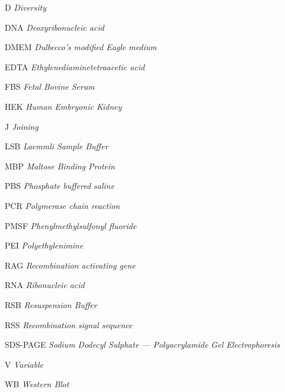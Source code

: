 \documentclass[
	12pt,				%
	openright,			%
	twoside,			%
	a4paper,			%
	]{abntex2}
\begin{document}

\begin{siglas}
	\item[D] \textit{Diversity}
	\item[DNA] \textit{Deoxyribonucleic acid}
	\item[DMEM] \textit{Dulbecco's modified Eagle medium}
	\item[EDTA] \textit{Ethylenediaminetetraacetic acid}
	\item[FBS] \textit{Fetal Bovine Serum}
	\item[HEK] \textit{Human Embryonic Kidney}
	\item[J] \textit{Joining}
	\item[LSB] \textit{Laemmli Sample Buffer}
	\item[MBP] \textit{Maltose Binding Protein}
	\item[PBS] \textit{Phosphate buffered saline}
	\item[PCR] \textit{Polymerase chain reaction}
	\item[PMSF] \textit{Phenylmethylsulfonyl fluoride}
	\item[PEI] \textit{Polyethylenimine}
	\item[RAG] \textit{Recombination activating gene}
	\item[RNA] \textit{Ribonucleic acid}
	\item[RSB] \textit{Resuspension Buffer}
	\item[RSS] \textit{Recombination signal sequence}
	\item[SDS-PAGE] \textit{Sodium Dodecyl Sulphate --- Polyacrylamide Gel Electrophoresis}
	\item[V] \textit{Variable}
	\item[WB] \textit{Western Blot}
\end{siglas}


\tableofcontents*
\cleardoublepage
\end{document}
